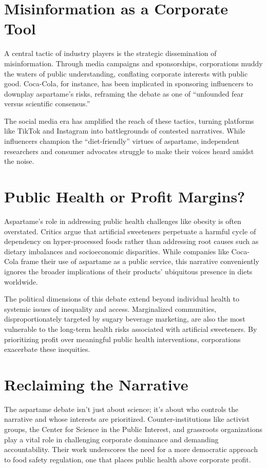 \section*{Misinformation as a Corporate Tool}

A central tactic of industry players is the strategic dissemination of misinformation. Through media campaigns and sponsorships, corporations muddy the waters of public understanding, conflating corporate interests with public good. Coca-Cola, for instance, has been implicated in sponsoring influencers to downplay aspartame’s risks, reframing the debate as one of “unfounded fear versus scientific consensus.”

The social media era has amplified the reach of these tactics, turning platforms like TikTok and Instagram into battlegrounds of contested narratives. While influencers champion the “diet-friendly” virtues of aspartame, independent researchers and consumer advocates struggle to make their voices heard amidst the noise.

\section*{Public Health or Profit Margins?}

Aspartame’s role in addressing public health challenges like obesity is often overstated. Critics argue that artificial sweeteners perpetuate a harmful cycle of dependency on hyper-processed foods rather than addressing root causes such as dietary imbalances and socioeconomic disparities. While companies like Coca-Cola frame their use of aspartame as a public service, this narrative conveniently ignores the broader implications of their products’ ubiquitous presence in diets worldwide.

The political dimensions of this debate extend beyond individual health to systemic issues of inequality and access. Marginalized communities, disproportionately targeted by sugary beverage marketing, are also the most vulnerable to the long-term health risks associated with artificial sweeteners. By prioritizing profit over meaningful public health interventions, corporations exacerbate these inequities.

\section*{Reclaiming the Narrative}

The aspartame debate isn’t just about science; it’s about who controls the narrative and whose interests are prioritized. Counter-institutions like activist groups, the Center for Science in the Public Interest, and grassroots organizations play a vital role in challenging corporate dominance and demanding accountability. Their work underscores the need for a more democratic approach to food safety regulation, one that places public health above corporate profit.

